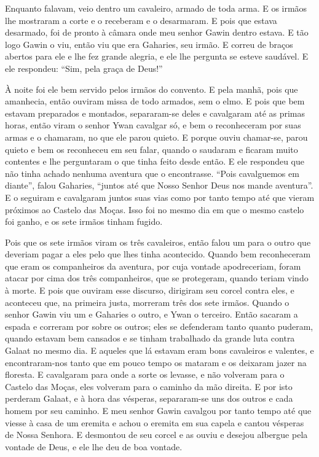 Enquanto falavam, veio dentro um cavaleiro, armado de toda arma. E os irmãos lhe
mostraram a corte e o receberam e o desarmaram. E pois que estava desarmado,
foi de pronto à câmara onde meu senhor Gawin  dentro estava. E tão logo
Gawin o viu, então viu que era Gaharies, seu irmão. E correu de braços abertos
para ele e lhe fez grande alegria, e ele lhe pergunta se esteve saudável. E ele
respondeu: “Sim, pela graça de Deus!” 

À noite foi ele bem servido pelos irmãos do convento. E pela manhã, pois que
amanhecia, então ouviram missa de todo armados, sem o elmo. E pois que bem
estavam preparados e montados, separaram-se deles e cavalgaram até as primas
horas, então viram o senhor Ywan cavalgar só, e bem o reconheceram por suas
armas e o chamaram, no que ele parou quieto. E porque ouviu chamar-se, parou
quieto e bem os reconheceu em seu falar, quando o saudaram e ficaram muito
contentes e lhe perguntaram o que tinha feito desde então. E ele respondeu que
não tinha achado nenhuma aventura que o encontrasse. “Pois cavalguemos em
diante”, falou Gaharies, “juntos até que Nosso Senhor Deus nos mande aventura”.
E o seguiram e cavalgaram juntos suas vias como por tanto tempo até que vieram
próximos ao Castelo das Moças. Isso foi no mesmo dia em que o mesmo castelo foi
ganho, e os sete irmãos tinham fugido. 

Pois que os sete irmãos viram os três cavaleiros, então falou um para o outro
que deveriam pagar a eles pelo que lhes tinha acontecido. Quando bem
reconheceram que eram os companheiros da aventura, por cuja vontade
apodreceriam, foram atacar por cima dos três companheiros, que se protegeram,
quando teriam vindo à morte. E pois que ouviram esse discurso, dirigiram seu
corcel contra eles, e aconteceu que, na primeira justa, morreram três dos sete
irmãos. Quando o senhor Gawin viu um e Gaharies o outro, e Ywan o terceiro.
Então sacaram a espada e correram por sobre os outros; eles se defenderam tanto
quanto puderam, quando estavam bem cansados e se tinham trabalhado da grande
luta contra Galaat no mesmo dia. E aqueles que lá estavam eram bons cavaleiros
e valentes, e encontraram-nos tanto que em pouco tempo os mataram e os deixaram
jazer na floresta. E cavalgaram para onde a sorte os levasse, e não volveram
para o Castelo das Moças, eles volveram para o caminho da mão direita. E por
isto perderam Galaat, e à hora das vésperas, separaram-se uns dos outros e cada
homem por seu caminho. E meu senhor Gawin  cavalgou por tanto tempo até
que viesse à casa de um eremita e achou o eremita em sua capela e cantou
vésperas de Nossa Senhora. E desmontou de seu corcel e as ouviu e desejou
albergue pela vontade de Deus, e ele lhe deu de boa vontade.

